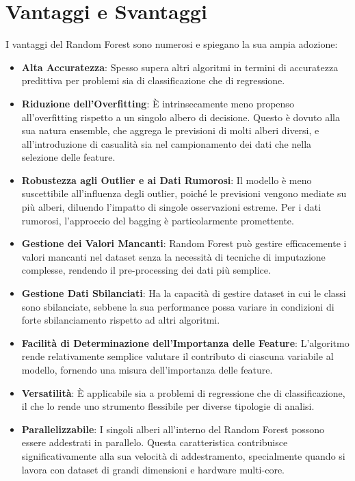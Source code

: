 \documentclass[a4paper,12pt]{report}
\begin{document}
	\section{Vantaggi e Svantaggi}
	
	I vantaggi del Random Forest sono numerosi e spiegano la sua ampia adozione:
	\begin{itemize}
		\item \textbf{Alta Accuratezza}: Spesso supera altri algoritmi in termini di accuratezza predittiva per problemi sia di classificazione che di regressione.
		\item \textbf{Riduzione dell'Overfitting}: È intrinsecamente meno propenso all'overfitting rispetto a un singolo albero di decisione. Questo è dovuto alla sua natura ensemble, che aggrega le previsioni di molti alberi diversi, e all'introduzione di casualità sia nel campionamento dei dati che nella selezione delle feature.
		\item \textbf{Robustezza agli Outlier e ai Dati Rumorosi}: Il modello è meno suscettibile all'influenza degli outlier, poiché le previsioni vengono mediate su più alberi, diluendo l'impatto di singole osservazioni estreme. Per i dati rumorosi, l'approccio del bagging è particolarmente promettente.
		\item \textbf{Gestione dei Valori Mancanti}: Random Forest può gestire efficacemente i valori mancanti nel dataset senza la necessità di tecniche di imputazione complesse, rendendo il pre-processing dei dati più semplice.
		\item \textbf{Gestione Dati Sbilanciati}: Ha la capacità di gestire dataset in cui le classi sono sbilanciate, sebbene la sua performance possa variare in condizioni di forte sbilanciamento rispetto ad altri algoritmi.
		\item \textbf{Facilità di Determinazione dell'Importanza delle Feature}: L'algoritmo rende relativamente semplice valutare il contributo di ciascuna variabile al modello, fornendo una misura dell'importanza delle feature.
		\item \textbf{Versatilità}: È applicabile sia a problemi di regressione che di classificazione, il che lo rende uno strumento flessibile per diverse tipologie di analisi.
		\item \textbf{Parallelizzabile}: I singoli alberi all'interno del Random Forest possono essere addestrati in parallelo. Questa caratteristica contribuisce significativamente alla sua velocità di addestramento, specialmente quando si lavora con dataset di grandi dimensioni e hardware multi-core.
	\end{itemize}
	
\end{document}
